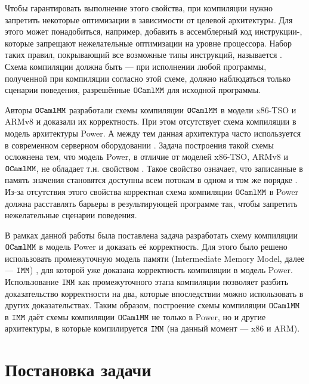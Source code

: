 Чтобы гарантировать выполнение этого свойства, при компиляции нужно запретить некоторые оптимизации в зависимости от целевой архитектуры.
Для этого может понадобиться, например, добавить в ассемблерный код инструкции-, которые запрещают нежелательные оптимизации на уровне процессора. 
Набор таких правил, покрывающий все возможные типы инструкций, называется . Схема компиляции должна быть  --- при исполнении любой программы, полученной при компиляции согласно этой схеме, должно наблюдаться только сценарии поведения, разрешённые $\mathtt{OCaml}\allowbreak \mathtt{MM}$ для исходной программы.

Авторы $\mathtt{OCaml}\allowbreak \mathtt{MM}$ разработали схемы компиляции $\mathtt{OCaml}\allowbreak \mathtt{MM}$ в модели x86-TSO и ARMv8 \cite{omm} и доказали их корректность. При этом отсутствует схема компиляции в модель архитектуры Power. А между тем данная архитектура часто используется в современном серверном оборудовании \cite{power-servers}. Задача построения такой схемы осложнена тем, что модель Power, в отличие от моделей x86-TSO, ARMv8 и $\mathtt{OCaml}\allowbreak \mathtt{MM}$, не обладает т.н. свойством . Такое свойство означает, что записанные в память значения становятся доступны всем потокам в одном и том же порядке \cite{arm}. Из-за отсутствия этого свойства корректная схема компиляции $\mathtt{OCaml}\allowbreak \mathtt{MM}$ в Power должна расставлять барьеры в результирующей программе так, чтобы запретить нежелательные сценарии поведения. 

В рамках данной работы была поставлена задача разработать схему компиляции $\mathtt{OCaml}\allowbreak \mathtt{MM}$ в модель Power и доказать её корректность. Для этого было решено использовать промежуточную модель памяти (Intermediate Memory Model, далее — $\mathtt{IMM}$) \cite{imm}, для которой уже доказана корректность компиляции в модель Power. Использование $\mathtt{IMM}$ как промежуточного этапа компиляции позволяет разбить доказательство корректности  на два, которые впоследствии можно использовать в других доказательствах. Таким образом, построение схемы компиляции $\mathtt{OCaml}\allowbreak \mathtt{MM}$ в $\mathtt{IMM}$ даёт схемы компиляции $\mathtt{OCaml}\allowbreak \mathtt{MM}$ не только в Power, но и другие архитектуры, в которые компилируется $\mathtt{IMM}$ (на данный момент --- x86 и ARM). 


\section{Постановка задачи}

